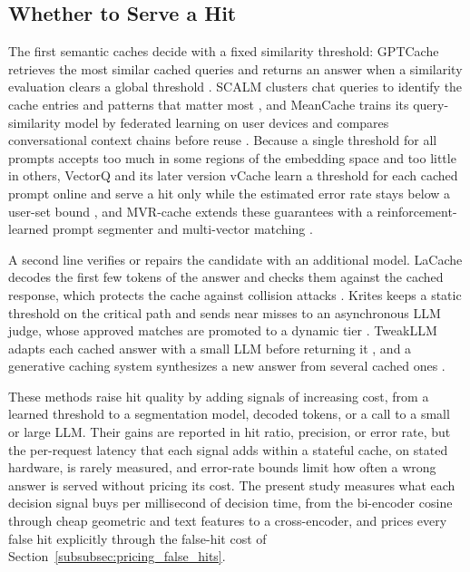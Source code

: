\documentclass[authoryear,preprint,review,12pt]{elsarticle}
\begin{document}
\subsection{Whether to Serve a Hit}
\label{subsec:rw_hit}
The first semantic caches decide with a fixed similarity threshold: GPTCache retrieves the most similar cached queries and returns an answer when a similarity evaluation clears a global threshold \citep{bang2023gptcache}. SCALM clusters chat queries to identify the cache entries and patterns that matter most \citep{li2024scalm}, and MeanCache trains its query-similarity model by federated learning on user devices and compares conversational context chains before reuse \citep{gill2024meancache}. Because a single threshold for all prompts accepts too much in some regions of the embedding space and too little in others, VectorQ and its later version vCache learn a threshold for each cached prompt online and serve a hit only while the estimated error rate stays below a user-set bound \citep{Schroeder2025VectorQ,schroeder2026vcache}, and MVR-cache extends these guarantees with a reinforcement-learned prompt segmenter and multi-vector matching \citep{noshad2026mvrcache}.

A second line verifies or repairs the candidate with an additional model. LaCache decodes the first few tokens of the answer and checks them against the cached response, which protects the cache against collision attacks \citep{liang2026lacache}. Krites keeps a static threshold on the critical path and sends near misses to an asynchronous LLM judge, whose approved matches are promoted to a dynamic tier \citep{singh2026krites}. TweakLLM adapts each cached answer with a small LLM before returning it \citep{cheema2025tweakllm}, and a generative caching system synthesizes a new answer from several cached ones \citep{iyengar2025generative}.

These methods raise hit quality by adding signals of increasing cost, from a learned threshold to a segmentation model, decoded tokens, or a call to a small or large LLM. Their gains are reported in hit ratio, precision, or error rate, but the per-request latency that each signal adds within a stateful cache, on stated hardware, is rarely measured, and error-rate bounds limit how often a wrong answer is served without pricing its cost. The present study measures what each decision signal buys per millisecond of decision time, from the bi-encoder cosine through cheap geometric and text features to a cross-encoder, and prices every false hit explicitly through the false-hit cost of Section~\ref{subsubsec:pricing_false_hits}.
\end{document}
